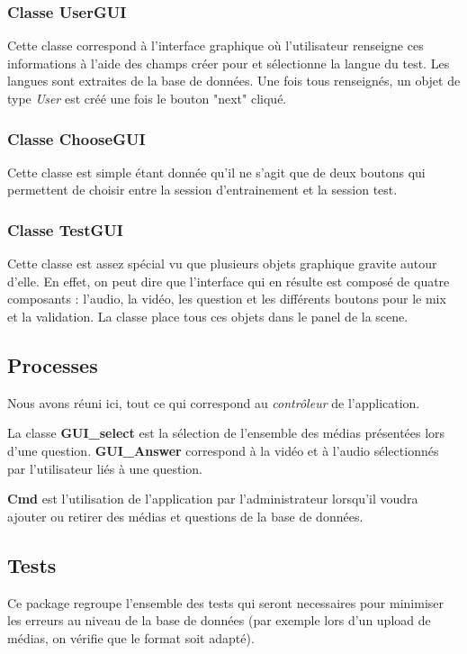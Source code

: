 \subsubsection{Classe UserGUI}

Cette classe correspond à l'interface graphique où l'utilisateur renseigne ces informations à l'aide des champs créer pour et sélectionne la langue du test. Les langues sont extraites de la base de données. Une fois tous renseignés, un objet de type \textit{User} est créé une fois le bouton "next" cliqué.

\subsubsection{Classe ChooseGUI}

Cette classe est simple étant donnée qu'il ne s'agit que de deux boutons qui permettent de choisir entre la session d'entrainement et la session test.

\subsubsection{Classe TestGUI}

Cette classe est assez spécial vu que plusieurs objets graphique gravite autour d'elle. En effet, on peut dire que l'interface qui en résulte est composé de quatre composants : l'audio, la vidéo, les question et les différents boutons pour le mix et la validation. La classe place tous ces objets dans le panel de la scene. 


\subsection{Processes}

Nous avons réuni ici, tout ce qui correspond au \textit{contrôleur} de l'application.

La classe \textbf{GUI\_select} est la sélection de l'ensemble des médias présentées lors d'une question.
\textbf{GUI\_Answer} correspond à la vidéo et à l'audio sélectionnés par l'utilisateur liés à une question.

\textbf{Cmd} est l'utilisation de l'application par l'administrateur lorsqu'il voudra ajouter ou retirer des médias et questions de la base de données.

\subsection{Tests}

Ce package regroupe l'ensemble des tests qui seront necessaires pour minimiser les erreurs au niveau de la base de données (par exemple lors d'un upload de médias, on vérifie que le format soit adapté).